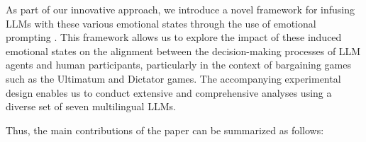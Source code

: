 \documentclass{article}
\begin{document}







As part of our innovative approach, we introduce a novel framework for infusing LLMs \cite{akata2023playing, brookins} with these various emotional states through the use of emotional prompting \cite{li2023large}. This framework allows us to explore the impact of these induced emotional states on the alignment between the decision-making processes of LLM agents and human participants, particularly in the context of bargaining games such as the Ultimatum and Dictator games. The accompanying experimental design enables us to conduct extensive and comprehensive analyses using a diverse set of seven multilingual LLMs.

Thus, the main contributions of the paper can be summarized as follows:
\end{document}
